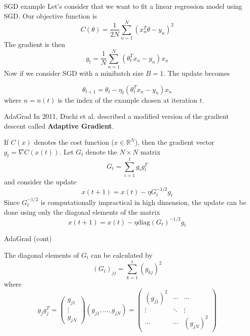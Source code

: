 \documentclass{beamer}
\begin{document}
\begin{frame}{SGD example}
	Let's consider that we want to fit a linear regression model using SGD. 
	Our objective function is
	\begin{equation*}
		C(\theta)= \frac{1}{2N} \sum_{n=1}^{N}(x_n^T \theta -y_n)^2
	\end{equation*}
	The gradient is then
	\begin{equation*}
		g_t = \frac{1}{N} \sum_{n=1}^{N} (\theta_t^T x_n - y_n )x_n
	\end{equation*}
	Now if we consider SGD with a minibatch size $B=1$. The update becomes
	
	\begin{equation*}
		\theta_{t+1}= \theta_t - \eta_t(\theta_t^T x_n -y_n)x_n
	\end{equation*}
	where $n=n(t)$ is the index of the example chosen at iteration $t$. 
\end{frame}


\begin{frame}{AdaGrad}
	In 2011, Duchi et al. described a modified version of the gradient descent called \textbf{Adaptive Gradient}. 
	
	If $C(x)$ denotes the cost function ($x\in \mathbb{R}^N$), then the gradient vector $g_t= \nabla C(x(t))$.  Let $G_t$ denote the $N \times N$ matrix
	\begin{equation*}
		G_t = \sum_{i=1}^{t} g_i g_i^T
	\end{equation*}
	and consider the update
	\begin{equation*}
		x(t+1)=x(t)- \eta G_t^{-1/2} g_t
	\end{equation*}
Since $G_t^{-1/2}$ is computationally impractical in high dimension, the update can be done using only the diagonal elements of the matrix
	\begin{equation*}
	x(t+1)=x(t)- \eta \text{diag}(G_t)^{-1/2} g_t
\end{equation*}


\end{frame}

\begin{frame}{AdaGrad (cont)}
	
	
	The diagonal elements of $G_t$ can be calculated by
	\begin{equation*}
		(G_t)_{jj}= \sum_{k=1}^t (g_{kj})^2
	\end{equation*}
where 
\begin{equation*}
	g_jg_j^T= \begin{pmatrix}
		g_{j1} \\
	\vdots\\
g_{jN}
\end{pmatrix}
(g_{j1},\ldots, g_{jN}) =
\begin{pmatrix}
	(g_{j1})^2 & \cdots & \cdots \\
	\vdots & \ddots & \vdots \\
	\cdots & \cdots & (g_{jN})^2
\end{pmatrix}
\end{equation*}
\end{frame}
\end{document}
